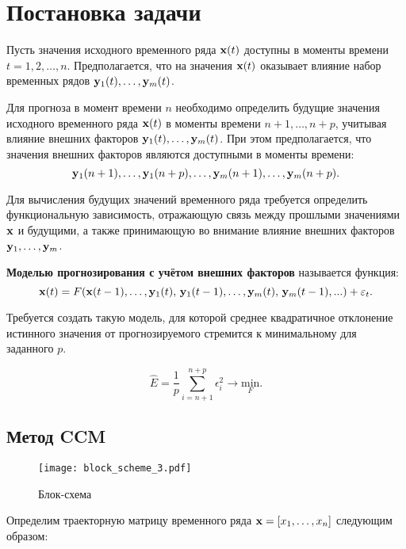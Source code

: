 \documentclass[a4paper, 12pt]{article}
\begin{document}
\section{Постановка задачи}
Пусть значения исходного временного ряда $\mathbf{x}(t)$ доступны в  моменты времени $t = 1, 2, \ldots, n$. Предполагается, что на значения $\mathbf{x}(t)$ оказывает влияние набор временных рядов $\mathbf{y}_1(t), \ldots, \mathbf{y}_m(t)$.

Для прогноза в момент времени $n$ необходимо определить будущие значения исходного временного ряда $\mathbf{x}(t)$ в моменты времени $n+1, \ldots, n+p$, учитывая влияние внешних факторов $\mathbf{y}_1(t), \ldots, \mathbf{y}_m(t)$. При этом предполагается, что значения внешних факторов являются доступными в моменты времени: \[\mathbf{y}_1(n+1), \ldots, \mathbf{y}_1(n+p), \ldots, \mathbf{y}_m(n+1), \ldots, \mathbf{y}_m(n+p).\]

Для вычисления будущих значений временного ряда требуется определить функциональную зависимость, отражающую связь между прошлыми значениями $\mathbf{x}$ и будущими, а также принимающую во внимание влияние внешних факторов $\mathbf{y}_1, \ldots, \mathbf{y}_m$.

\begin{definition}
	\textbf{Моделью прогнозирования с учётом внешних факторов} называется функция:
	\begin{equation*}
		\mathbf{x}(t) = F(\mathbf{x}(t-1), \ldots, \mathbf{y}_1(t), \, \mathbf{y}_1(t-1), \ldots, \mathbf{y}_m(t), \, \mathbf{y}_m(t-1), ...) + \varepsilon_t.
	\end{equation*}
\end{definition}

Требуется создать такую модель, для которой среднее квадратичное отклонение истинного значения от прогнозируемого стремится к минимальному для заданного $p$. 

\begin{equation*}
	\widehat{E} = \dfrac{1}{p} \sum\limits_{i=n+1}^{n+p} \epsilon_i^2 \rightarrow \underset{F}{\text{min}}.
\end{equation*}

\subsection{Метод CCM}
\begin{figure}[bhtp]
	\texttt{[image: block\_scheme\_3.pdf]}
	\caption{Блок-схема}
	\label{fig:schema}
\end{figure}

Определим траекторную матрицу временного ряда $\mathbf{x} = [x_1, \ldots, x_n]$ следующим образом: 
\end{document}
